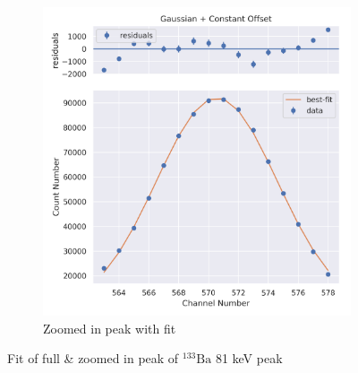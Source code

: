 \documentclass[11pt,a4paper]{article}
\newcommand{\element}[2]{$^{#2}\textrm{#1}$}
\begin{document}
\begin{figure}[H]
\begin{subfigure}{.5\linewidth}
    \includegraphics[width=\linewidth]{./Images/Barium133/Gauss/Gauss_1_Zoom.png}
    \caption{Zoomed in peak with fit}
  \end{subfigure}
  \caption{Fit of full \& zoomed in peak of \element{Ba}{133} 81 keV peak}
\end{figure}
\end{document}
